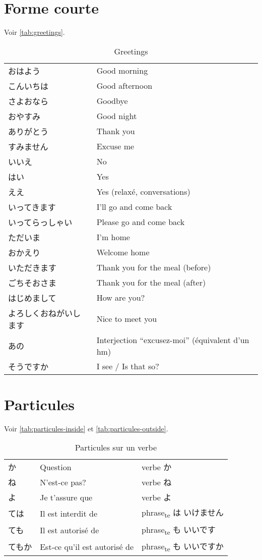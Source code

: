 \documentclass[a4paper,10pt,french,openany]{memoir}
\begin{document}
\section{Forme courte}




Voir \autoref{tab:greetings}.

\begin{table}[h]
 \centering
 \caption{Greetings}
 \label{tab:greetings}
 \begin{tabular}{ll}
  おはよう & Good morning \\
  こんいちは & Good afternoon \\
  さよおなら & Goodbye \\
  おやすみ & Good night \\
  ありがとう & Thank you \\
  すみません & Excuse me \\
  いいえ & No \\
  はい & Yes \\
  ええ & Yes (relaxé, conversations) \\
  いってきます & I'll go and come back \\
  いってらっしゃい & Please go and come back \\
  ただいま & I'm home \\
  おかえり & Welcome home \\
  いただきます & Thank you for the meal (before) \\
  ごちそおさま & Thank you for the meal (after) \\
  はじめまして & How are you? \\
  よろしくおねがいします & Nice to meet you \\
  あの & Interjection ``excusez-moi'' (équivalent d'un hm) \\
  そうですか & I see / Is that so? \\
 \end{tabular}
\end{table}

\section{Particules}

Voir \autoref{tab:particules-inside} et \autoref{tab:particules-outside}.

\begin{table}[h]
 \centering
 \caption{Particules sur un verbe}
 \label{tab:particules-outside}
 \begin{tabular}{lll}
 か & Question & verbe か \\
 ね & N'est-ce pas? & verbe ね \\
 よ & Je t'assure que & verbe よ \\
 ては & Il est interdit de & phrase\textsubscript{te} は いけません \\
 ても & Il est autorisé de & phrase\textsubscript{te} も いいです \\
 てもか & Est-ce qu'il est autorisé de & phrase\textsubscript{te} も いいですか \\
 \end{tabular}
\end{table}
\end{document}
